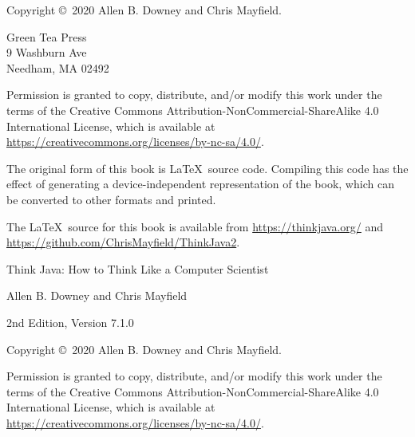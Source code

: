 \documentclass[12pt]{book}
\newcommand{\thetitle}{Think Java}
\newcommand{\thesubtitle}{How to Think Like a Computer Scientist}
\newcommand{\theauthors}{Allen B. Downey and Chris Mayfield}
\newcommand{\theversion}{2nd Edition, Version 7.1.0}
\theoremstyle{exercise}
\begin{document}
\begin{latexonly}
\newpage
\thispagestyle{empty}

Copyright \copyright ~2020 \theauthors.

\vspace{0.2in}

\begin{flushleft}
Green Tea Press \\
9 Washburn Ave \\
Needham, MA 02492
\end{flushleft}

Permission is granted to copy, distribute, and/or modify this work under the terms of the Creative Commons Attribution-NonCommercial-ShareAlike 4.0 International License, which is available at \url{https://creativecommons.org/licenses/by-nc-sa/4.0/}.

The original form of this book is \LaTeX\ source code.
Compiling this code has the effect of generating a device-independent representation of the book, which can be converted to other formats and printed.

The \LaTeX\ source for this book is available from \url{https://thinkjava.org/} and \url{https://github.com/ChrisMayfield/ThinkJava2}.


\cleardoublepage
\setcounter{tocdepth}{1}
\tableofcontents

\end{latexonly}


\begin{htmlonly}

\vspace{1em}

{\Large \thetitle: \thesubtitle}

{\large \theauthors}

\theversion

\vspace{1em}

Copyright \copyright ~2020 \theauthors.

Permission is granted to copy, distribute, and/or modify this work under the terms of the Creative Commons Attribution-NonCommercial-ShareAlike 4.0 International License, which is available at \url{https://creativecommons.org/licenses/by-nc-sa/4.0/}.

\vspace{1em}

\end{htmlonly}
\end{document}
